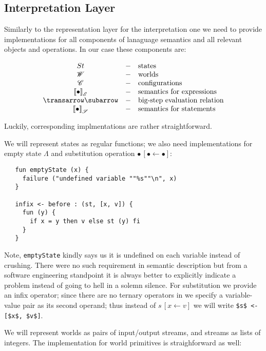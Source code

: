 \subsection{Interpretation Layer}

Similarly to the representation layer for the interpretation one we need to provide implementations for all components of
lanaguage semantics and all relevant objects and operations. In our case these components are:

\[
\begin{array}{ccl}
  St                            & - & \mbox{states}\\
  \mathscr{W}                   & - & \mbox{worlds}\\
  \mathscr{C}                   & - & \mbox{configurations}\\
  \sembr{\bullet}^\ph_\mathscr{E} & - & \mbox{semantics for expressions}\\
  \transrel                     & - & \mbox{big-step evaluation relation}\\
  \sembr{\bullet}^\ph_\mathscr{S} & - & \mbox{semantics for statements}
\end{array}
\]

Luckily, corresponding \lama implmentations are rather straightforward.

We will represent states as regular \lama functions; we also need implementations for empty state $\Lambda$ and
substitution operation $\bullet\,[\bullet\gets\bullet]$:

\begin{lstlisting}
   fun emptyState (x) {
     failure ("undefined variable ""%s""\n", x)
   }

   infix <- before : (st, [x, v]) {
     fun (y) {
       if x = y then v else st (y) fi
     }
   }
\end{lstlisting}

Note, \lstinline|emptyState| kindly says us it is undefined on each variable instead of crushing. There were no such
requirement in semantic description but from a software engineering standpoint it is always better to explicitly indicate
a problem instead of going to hell in a solemn silence. For substitution we provide an infix operator; since there are
no ternary operators in \lama we specify a variable-value pair as its second operand; thus instead of
$s\,[x\gets v]$ we will write \lstinline[mathescape=true]|$s$ <- [$x$, $v$]|.

We will represent worlds as pairs of input/output streams, and streams as lists of integers. The implementation for
world primitives is straighforward as well:

